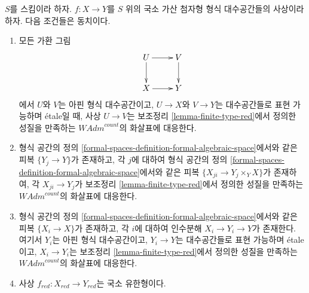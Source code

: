 \begin{lemma}
\label{lemma-finite-type-red-morphisms}
$S$를 스킴이라 하자. $f : X \to Y$를 $S$ 위의
국소 가산 첨자형 형식 대수공간들의 사상이라 하자. 다음 조건들은 동치이다.
\begin{enumerate}
\item 모든 가환 그림
$$
\xymatrix{
U \ar[d] \ar[r] & V \ar[d] \\
X \ar[r] & Y
}
$$
에서 $U$와 $V$는 아핀 형식 대수공간이고, $U \to X$와 $V \to Y$는
대수공간들로 표현 가능하며 \'etale일 때, 사상 $U \to V$는
보조정리 \ref{lemma-finite-type-red}에서 정의한 성질을 만족하는
$\textit{WAdm}^{count}$의 화살표에 대응한다.
\item 형식 공간의 정의
\ref{formal-spaces-definition-formal-algebraic-space}에서와 같은 피복
$\{Y_j \to Y\}$가 존재하고, 각 $j$에 대하여 형식 공간의 정의
\ref{formal-spaces-definition-formal-algebraic-space}에서와 같은 피복
$\{X_{ji} \to Y_j \times_Y X\}$가 존재하여, 각 $X_{ji} \to Y_j$가
보조정리 \ref{lemma-finite-type-red}에서 정의한 성질을 만족하는
$\textit{WAdm}^{count}$의 화살표에 대응한다.
\item 형식 공간의 정의
\ref{formal-spaces-definition-formal-algebraic-space}에서와 같은 피복
$\{X_i \to X\}$가 존재하고, 각 $i$에 대하여 인수분해
$X_i \to Y_i \to Y$가 존재한다. 여기서 $Y_i$는 아핀 형식 대수공간이고,
$Y_i \to Y$는 대수공간들로 표현 가능하며 \'etale이고,
$X_i \to Y_i$는 보조정리 \ref{lemma-finite-type-red}에서 정의한
성질을 만족하는 $\textit{WAdm}^{count}$의 화살표에 대응한다.
\item 사상 $f_{red} : X_{red} \to Y_{red}$는 국소 유한형이다.
\end{enumerate}
\end{lemma}

